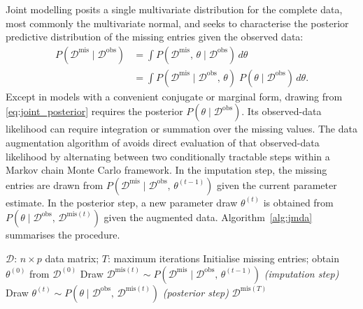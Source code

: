 Joint modelling posits a single multivariate distribution for the complete data, most commonly the multivariate normal, and seeks to characterise the posterior predictive distribution of the missing entries given the observed data:
\begin{equation}
\begin{aligned}
    P(\mathcal{D}^{\mathrm{mis}} \mid \mathcal{D}^{\mathrm{obs}})
    &= \int P(\mathcal{D}^{\mathrm{mis}},\, \theta \mid \mathcal{D}^{\mathrm{obs}}) \, d\theta \\
    &= \int P(\mathcal{D}^{\mathrm{mis}} \mid \mathcal{D}^{\mathrm{obs}},\, \theta)\;
           P(\theta \mid \mathcal{D}^{\mathrm{obs}}) \, d\theta.
\end{aligned}
\label{eq:joint_posterior}
\end{equation}
Except in models with a convenient conjugate or marginal form, drawing from \eqref{eq:joint_posterior} requires the posterior $P(\theta\mid\mathcal{D}^{\mathrm{obs}})$. Its observed-data likelihood can require integration or summation over the missing values. The data augmentation algorithm of \citet{tanner1987calculation} avoids direct evaluation of that observed-data likelihood by alternating between two conditionally tractable steps within a Markov chain Monte Carlo framework. In the imputation step, the missing entries are drawn from $P(\mathcal{D}^{\mathrm{mis}} \mid \mathcal{D}^{\mathrm{obs}},\, \theta^{(t-1)})$ given the current parameter estimate. In the posterior step, a new parameter draw $\theta^{(t)}$ is obtained from $P(\theta \mid \mathcal{D}^{\mathrm{obs}},\, \mathcal{D}^{\mathrm{mis}(t)})$ given the augmented data. Algorithm~\ref{alg:jmda} summarises the procedure.

\begin{algorithm}[t]
\caption{Joint modelling with data augmentation}
\label{alg:jmda}
\begin{algorithmic}[1]
    \Require $\mathcal{D}$: $n \times p$ data matrix; $T$: maximum iterations
    \State Initialise missing entries; obtain $\theta^{(0)}$ from $\mathcal{D}^{(0)}$
        \State Draw $\mathcal{D}^{\mathrm{mis}(t)} \sim
               P(\mathcal{D}^{\mathrm{mis}} \mid \mathcal{D}^{\mathrm{obs}},\,
               \theta^{(t-1)})$
               \hfill\textit{(imputation step)}
        \State Draw $\theta^{(t)} \sim
               P(\theta \mid \mathcal{D}^{\mathrm{obs}},\,
               \mathcal{D}^{\mathrm{mis}(t)})$
               \hfill\textit{(posterior step)}
    \EndFor
    \State \Return $\mathcal{D}^{\mathrm{mis}(T)}$
\end{algorithmic}
\end{algorithm}

